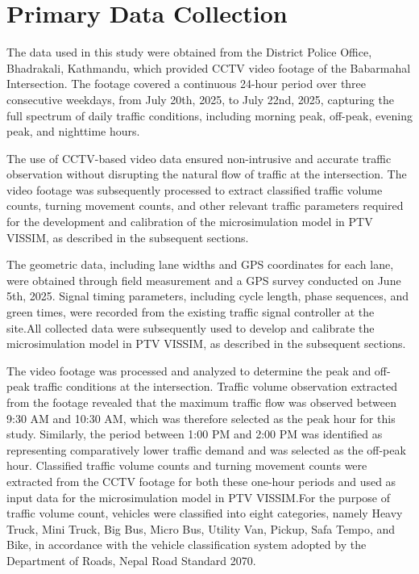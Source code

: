 \section{Primary Data Collection }
The data used in this study were obtained from the District 
Police Office, Bhadrakali, Kathmandu, which provided CCTV 
video footage of the Babarmahal Intersection. The footage 
covered a continuous 24-hour period over three consecutive 
weekdays, from July 20th, 2025, to July 22nd, 2025, capturing 
the full spectrum of daily traffic conditions, including 
morning peak, off-peak, evening peak, and nighttime hours.

The use of CCTV-based video data ensured non-intrusive and 
accurate traffic observation without disrupting the natural 
flow of traffic at the intersection. The video footage was 
subsequently processed to extract classified traffic volume 
counts, turning movement counts, and other relevant traffic 
parameters required for the development and calibration of
the microsimulation model in PTV VISSIM, as described in the 
subsequent sections. 

The geometric data, including lane widths and GPS coordinates for 
each lane, were obtained through field measurement and a GPS survey 
conducted on June 5th, 2025. Signal timing parameters, 
including cycle length, phase sequences, and green times, 
were recorded from the existing traffic signal controller at 
the site.All collected data were subsequently used to 
develop and calibrate the microsimulation model in 
PTV VISSIM, as described in the subsequent sections.

The video footage was processed and analyzed to determine 
the peak and off-peak traffic conditions at the intersection. 
Traffic volume observation extracted from the footage 
revealed that the maximum traffic flow was observed between 9:30 AM and 10:30 AM, 
which was therefore selected as the peak hour for this study. 
Similarly, the period between 1:00 PM and 2:00 PM was 
identified as representing comparatively lower traffic demand and 
was selected as the off-peak hour. Classified 
traffic volume counts and turning movement counts were 
extracted from the CCTV footage for both these one-hour 
periods and used as input data for the microsimulation model 
in PTV VISSIM.For the purpose of traffic volume count, 
vehicles were classified into eight categories, namely Heavy 
Truck, Mini Truck, Big Bus, Micro Bus, Utility Van, Pickup, 
Safa Tempo, and Bike, in accordance with the vehicle 
classification system adopted by the Department of Roads, 
Nepal Road Standard 2070.

